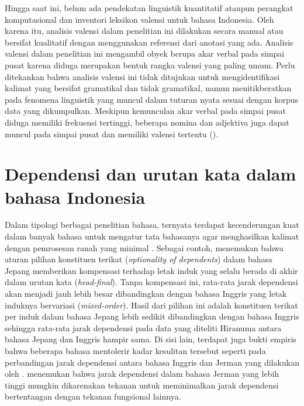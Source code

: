 Hingga saat ini, belum ada pendekatan linguistik kuantitatif ataupun perangkat komputasional dan inventori leksikon valensi untuk bahasa Indonesia. Oleh karena itu, analisis valensi dalam penelitian ini dilakukan secara manual atau bersifat kualitatif dengan menggunakan referensi dari anotasi yang ada. Analisis valensi dalam penelitian ini mengambil obyek berupa akar verbal pada simpai pusat karena diduga merupakan bentuk rangka valensi yang paling umum. Perlu ditekankan bahwa analisis valensi ini tidak ditujukan untuk mengidentifikasi kalimat yang bersifat gramatikal dan tidak gramatikal, namun menitikberatkan pada fenomena linguistik yang muncul dalam tuturan nyata sesuai dengan korpus data yang dikumpulkan. Meskipun kemunculan akar verbal pada simpai pusat diduga memiliki frekuensi tertinggi, beberapa nomina dan adjektiva juga dapat muncul pada simpai pusat dan memiliki valensi tertentu (\citealp{vreznivckova2003czech, hajic2003pdt}).

\section{Dependensi dan urutan kata dalam bahasa Indonesia}
Dalam tipologi berbagai penelitian bahasa, ternyata terdapat kecenderungan kuat dalam banyak bahasa untuk mengatur tata bahasanya agar menghasilkan kalimat dengan pemrosesan ranah yang minimal \citep{hawkins2001second}. Sebagai contoh, \cite{hiranuma1999syntactic} menemukan bahwa aturan pilihan konstituen terikat (\textit{optionality of dependents}) dalam bahasa Jepang memberikan kompensasi terhadap letak induk yang selalu berada di akhir dalam urutan kata (\textit{head-final}). Tanpa kompensasi ini, rata-rata jarak dependensi akan menjadi jauh lebih besar dibandingkan dengan bahasa Inggris yang letak induknya bervariasi (\textit{mixed-order}). Hasil dari pilihan ini adalah konstituen terikat per induk dalam bahasa Jepang lebih sedikit dibandingkan dengan bahasa Inggris sehingga rata-rata jarak dependensi pada data yang diteliti Hiranuma antara bahasa Jepang dan Inggris hampir sama. Di sisi lain, terdapat juga bukti empiris bahwa beberapa bahasa mentolerir kadar kesulitan tersebut seperti pada perbandingan jarak dependensi antara bahasa Inggris dan Jerman yang dilakukan oleh \cite{eppler2005syntax}. \cite{eppler2005syntax} menemukan bahwa jarak dependensi dalam bahasa Jerman yang lebih tinggi mungkin dikarenakan tekanan untuk meminimalkan jarak dependensi bertentangan dengan tekanan fungsional lainnya.

